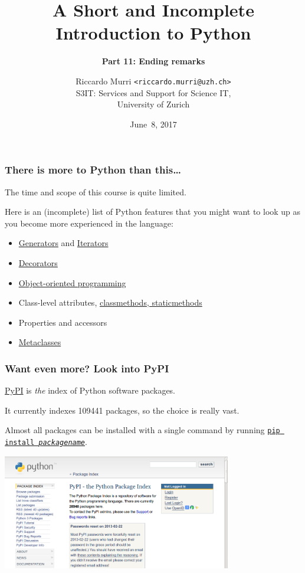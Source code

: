 \documentclass[english,serif,mathserif,xcolor=pdftex,dvipsnames,table]{beamer}
\title[Introduction to Python]{%
  A Short and Incomplete Introduction to Python
}
\subtitle{\bfseries Part 11: Ending remarks}
\author[R.~Murri]{%
  Riccardo Murri \texttt{<riccardo.murri@uzh.ch>}
  \\
  S3IT: Services and Support for Science IT,
  \\
  University of Zurich
}
\date{June~8, 2017}
\begin{document}
\maketitle



\begin{frame}
  \frametitle{There is more to Python than this\ldots}

  The time and scope of this course is quite limited.

  \+
  Here is an (incomplete) list of Python features that you might
  want to look up as you become more experienced in the language:
  \begin{itemize}
  \item
    \href{http://docs.python.org/2/tutorial/classes.html\#generators}{Generators}
    and
    \href{http://docs.python.org/2/tutorial/classes.html\#iterators}{Iterators}
  \item
    \href{http://www.artima.com/weblogs/viewpost.jsp?thread=240808}{Decorators}
  \item \href{https://github.com/gc3-uzh-ch/python-course}{Object-oriented programming}
  \item Class-level attributes, \href{http://stackoverflow.com/a/12179752/1808780}{classmethods, staticmethods}
  \item Properties and accessors
  \item \href{http://stackoverflow.com/a/6581949/459543}{Metaclasses}
  \end{itemize}
\end{frame}


\begin{frame}
  \frametitle{Want even more? Look into PyPI}

  \href{http://pypi.python.org}{PyPI} is \emph{the} index of Python software packages.

  \+ It currently indexes 109441 packages, so the choice is really vast.

  \+ Almost all packages can be installed with a single command by
  running \href{https://pypi.python.org/pypi/pip}{\texttt{pip install
    \emph{packagename}}}.

  \+
  \begin{center}
    \includegraphics[width=0.75\textwidth]{fig/pypi_screenshot.png}
  \end{center}
\end{frame}
\end{document}
